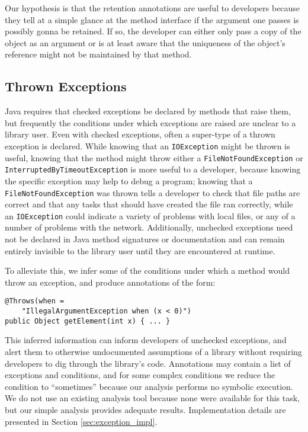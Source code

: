 Our hypothesis is that the retention annotations are useful to developers
because they tell at a simple glance at the method interface if the argument
one passes is possibly gonna be retained. If so, the developer can either only
pass a copy of the object as an argument or is at least aware that the uniqueness
of the object's reference might not be maintained by that method.

\subsection{Thrown Exceptions}

Java requires that checked exceptions be declared by methods that raise them,
but frequently the conditions under which exceptions are raised are unclear to a
library user. Even with checked exceptions, often a super-type of a thrown
exception is declared.  While knowing that an \texttt{IOException} might be
thrown is useful, knowing that the method might throw either a
\texttt{FileNotFoundException} or \texttt{InterruptedByTimeoutException} is more
useful to a developer, because knowing the specific exception may help to debug
a program; knowing that a \texttt{FileNotFoundException} was thrown tells a
developer to check that file paths are correct and that any tasks that should
have created the file ran correctly, while an \texttt{IOException} could
indicate a variety of problems with local files, or any of a number of problems
with the network.  Additionally, unchecked exceptions need not be declared in Java method
signatures or documentation and can remain entirely invisible to the library
user until they are encountered at runtime.

To alleviate this, we infer some of the conditions under which a method would
throw an exception, and produce annotations of the form:

\begin{verbatim}
@Throws(when =
    "IllegalArgumentException when (x < 0)")
public Object getElement(int x) { ... }
\end{verbatim}

This inferred information can inform developers of unchecked exceptions,
and alert them to otherwise undocumented assumptions of a library without
requiring developers to dig through the library's code.
Annotations may contain a list of exceptions and conditions, and for some
complex conditions we reduce the condition to ``sometimes'' because our analysis
performs no symbolic execution.  We do not use an
existing analysis tool because none were available for this task, but our
simple analysis provides adequate results.  Implementation details are presented
in Section \ref{sec:exception_impl}.


